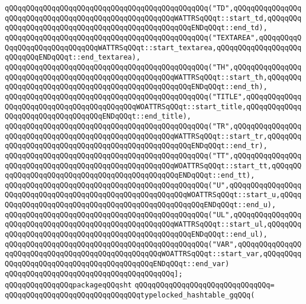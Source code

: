 \verb|qQQqqQQqqQQqqQQqqQQqqQQqqQQqqQQqqQQqqQQqqQQqqQQq("TD",qQQqqQQqqQQqqQQqqQQqqQQqqQQqqQQqqQQqqQQqqQQqqQQqqQQqqQQqWATTRSqQQqt::start_td,qQQqqQQqqQQqqQQqqQQqqQQqqQQqqQQqqQQqqQQqqQQqqQQqqQQqENDqQQqt::end_td),|\newline
\verb|qQQqqQQqqQQqqQQqqQQqqQQqqQQqqQQqqQQqqQQqqQQqqQQq("TEXTAREA",qQQqqQQqqQQqqQQqqQQqqQQqqQQqqQQqWATTRSqQQqt::start_textarea,qQQqqQQqqQQqqQQqqQQqqQQqqQQqENDqQQqt::end_textarea),|\newline
\verb|qQQqqQQqqQQqqQQqqQQqqQQqqQQqqQQqqQQqqQQqqQQqqQQq("TH",qQQqqQQqqQQqqQQqqQQqqQQqqQQqqQQqqQQqqQQqqQQqqQQqqQQqqQQqWATTRSqQQqt::start_th,qQQqqQQqqQQqqQQqqQQqqQQqqQQqqQQqqQQqqQQqqQQqqQQqqQQqENDqQQqt::end_th),|\newline
\verb|qQQqqQQqqQQqqQQqqQQqqQQqqQQqqQQqqQQqqQQqqQQqqQQq("TITLE",qQQqqQQqqQQqqQQqqQQqqQQqqQQqqQQqqQQqqQQqqQQqWOATTRSqQQqt::start_title,qQQqqQQqqQQqqQQqqQQqqQQqqQQqqQQqqQQqENDqQQqt::end_title),|\newline
\verb|qQQqqQQqqQQqqQQqqQQqqQQqqQQqqQQqqQQqqQQqqQQqqQQq("TR",qQQqqQQqqQQqqQQqqQQqqQQqqQQqqQQqqQQqqQQqqQQqqQQqqQQqqQQqWATTRSqQQqt::start_tr,qQQqqQQqqQQqqQQqqQQqqQQqqQQqqQQqqQQqqQQqqQQqqQQqqQQqENDqQQqt::end_tr),|\newline
\verb|qQQqqQQqqQQqqQQqqQQqqQQqqQQqqQQqqQQqqQQqqQQqqQQq("TT",qQQqqQQqqQQqqQQqqQQqqQQqqQQqqQQqqQQqqQQqqQQqqQQqqQQqqQQqWOATTRSqQQqt::start_tt,qQQqqQQqqQQqqQQqqQQqqQQqqQQqqQQqqQQqqQQqqQQqqQQqENDqQQqt::end_tt),|\newline
\verb|qQQqqQQqqQQqqQQqqQQqqQQqqQQqqQQqqQQqqQQqqQQqqQQq("U",qQQqqQQqqQQqqQQqqQQqqQQqqQQqqQQqqQQqqQQqqQQqqQQqqQQqqQQqqQQqWOATTRSqQQqt::start_u,qQQqqQQqqQQqqQQqqQQqqQQqqQQqqQQqqQQqqQQqqQQqqQQqqQQqENDqQQqt::end_u),|\newline
\verb|qQQqqQQqqQQqqQQqqQQqqQQqqQQqqQQqqQQqqQQqqQQqqQQq("UL",qQQqqQQqqQQqqQQqqQQqqQQqqQQqqQQqqQQqqQQqqQQqqQQqqQQqqQQqWATTRSqQQqt::start_ul,qQQqqQQqqQQqqQQqqQQqqQQqqQQqqQQqqQQqqQQqqQQqqQQqqQQqENDqQQqt::end_ul),|\newline
\verb|qQQqqQQqqQQqqQQqqQQqqQQqqQQqqQQqqQQqqQQqqQQqqQQq("VAR",qQQqqQQqqQQqqQQqqQQqqQQqqQQqqQQqqQQqqQQqqQQqqQQqqQQqWOATTRSqQQqt::start_var,qQQqqQQqqQQqqQQqqQQqqQQqqQQqqQQqqQQqqQQqqQQqENDqQQqt::end_var)|\newline
\verb|qQQqqQQqqQQqqQQqqQQqqQQqqQQqqQQqqQQqqQQq];|\newline
\newline
\verb|qQQqqQQqqQQqqQQqpackageqQQqsht|\newline
\verb|qQQqqQQqqQQqqQQqqQQqqQQqqQQqqQQq=|\newline
\verb|qQQqqQQqqQQqqQQqqQQqqQQqqQQqqQQqtypelocked_hashtable_gqQQq(|\newline
